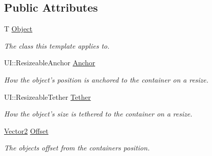 \subsection*{Public Attributes}
\begin{DoxyCompactItemize}
\item 
\hypertarget{structphys_1_1UI_1_1ResizingInfo_a2f925cf9136fdba5612d9ba741201dc2}{
T \hyperlink{structphys_1_1UI_1_1ResizingInfo_a2f925cf9136fdba5612d9ba741201dc2}{Object}}
\label{d0/d08/structphys_1_1UI_1_1ResizingInfo_a2f925cf9136fdba5612d9ba741201dc2}

\begin{DoxyCompactList}\small\item\em The class this template applies to. \item\end{DoxyCompactList}\item 
\hypertarget{structphys_1_1UI_1_1ResizingInfo_a2164abb4b82f0b7d26d13a13cc480010}{
UI::ResizeableAnchor \hyperlink{structphys_1_1UI_1_1ResizingInfo_a2164abb4b82f0b7d26d13a13cc480010}{Anchor}}
\label{d0/d08/structphys_1_1UI_1_1ResizingInfo_a2164abb4b82f0b7d26d13a13cc480010}

\begin{DoxyCompactList}\small\item\em How the object's position is anchored to the container on a resize. \item\end{DoxyCompactList}\item 
\hypertarget{structphys_1_1UI_1_1ResizingInfo_ab38a235a394d8c3bf3e15f331e94ae3b}{
UI::ResizeableTether \hyperlink{structphys_1_1UI_1_1ResizingInfo_ab38a235a394d8c3bf3e15f331e94ae3b}{Tether}}
\label{d0/d08/structphys_1_1UI_1_1ResizingInfo_ab38a235a394d8c3bf3e15f331e94ae3b}

\begin{DoxyCompactList}\small\item\em How the object's size is tethered to the container on a resize. \item\end{DoxyCompactList}\item 
\hypertarget{structphys_1_1UI_1_1ResizingInfo_ab9dbc0f04f78ff0081b54e461a37a75e}{
\hyperlink{classphys_1_1Vector2}{Vector2} \hyperlink{structphys_1_1UI_1_1ResizingInfo_ab9dbc0f04f78ff0081b54e461a37a75e}{Offset}}
\label{d0/d08/structphys_1_1UI_1_1ResizingInfo_ab9dbc0f04f78ff0081b54e461a37a75e}

\begin{DoxyCompactList}\small\item\em The objects offset from the containers position. \item\end{DoxyCompactList}\end{DoxyCompactItemize}


